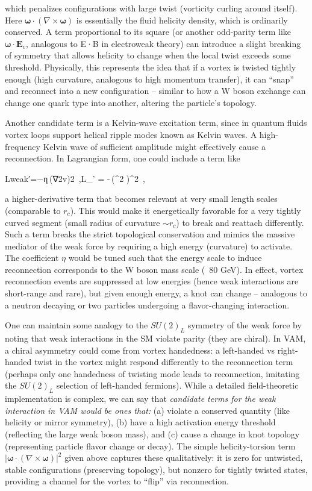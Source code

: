 which penalizes configurations with large twist (vorticity curling around itself). Here $\mathbf{\omega} \cdot (\nabla \times \mathbf{\omega})$ is essentially the fluid helicity density, which is ordinarily conserved. A term proportional to its square (or another odd-parity term like $\mathbf{\omega}\cdot\mathbf{E}_v$, analogous to E·B in electroweak theory) can introduce a slight breaking of symmetry that allows helicity to change when the local twist exceeds some threshold. Physically, this represents the idea that if a vortex is twisted tightly enough (high curvature, analogous to high momentum transfer), it can “snap” and reconnect into a new configuration – similar to how a W boson exchange can change one quark type into another, altering the particle’s topology.


Another candidate term is a Kelvin-wave excitation term, since in quantum fluids vortex loops support helical ripple modes known as Kelvin waves. A high-frequency Kelvin wave of sufficient amplitude might effectively cause a reconnection. In Lagrangian form, one could include a term like

Lweak′=−η (∇2v)2 ,L_{}' = -\eta\,(\nabla^2 )^2~,

a higher-derivative term that becomes relevant at very small length scales (comparable to $r_c$). This would make it energetically favorable for a very tightly curved segment (small radius of curvature $\sim r_c$) to break and reattach differently. Such a term breaks the strict topological conservation and mimics the massive mediator of the weak force by requiring a high energy (curvature) to activate. The coefficient $\eta$ would be tuned such that the energy scale to induce reconnection corresponds to the W boson mass scale (~80 GeV). In effect, vortex reconnection events are suppressed at low energies (hence weak interactions are short-range and rare), but given enough energy, a knot can change – analogous to a neutron decaying or two particles undergoing a flavor-changing interaction.


One can maintain some analogy to the $SU(2)_L$ symmetry of the weak force by noting that weak interactions in the SM violate parity (they are chiral). In VAM, a chiral asymmetry could come from vortex handedness: a left-handed vs right-handed twist in the vortex might respond differently to the reconnection term (perhaps only one handedness of twisting mode leads to reconnection, imitating the $SU(2)_L$ selection of left-handed fermions). While a detailed field-theoretic implementation is complex, we can say that \textit{candidate terms for the weak interaction in VAM would be ones that:} (a) violate a conserved quantity (like helicity or mirror symmetry), (b) have a high activation energy threshold (reflecting the large weak boson mass), and (c) cause a change in knot topology (representing particle flavor change or decay). The simple helicity-torsion term $|\mathbf{\omega}\cdot(\nabla\times\mathbf{\omega})|^2$ given above captures these qualitatively: it is zero for untwisted, stable configurations (preserving topology), but nonzero for tightly twisted states, providing a channel for the vortex to “flip” via reconnection.


